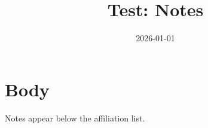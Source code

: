 \documentclass{article}
\title{Test: Notes}
\date{2026-01-01}
\begin{document}
\maketitle
\section{Body}
Notes appear below the affiliation list.
\end{document}
